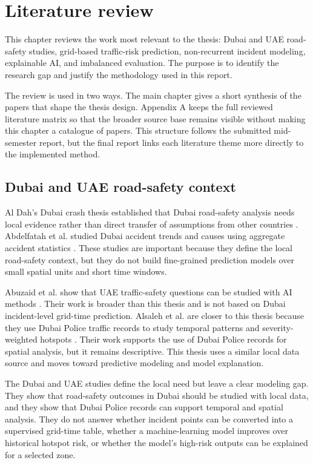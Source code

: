 \chapter{Literature review}

This chapter reviews the work most relevant to the thesis: Dubai and UAE road-safety studies, grid-based traffic-risk prediction, non-recurrent incident modeling, explainable AI, and imbalanced evaluation. The purpose is to identify the research gap and justify the methodology used in this report.

The review is used in two ways. The main chapter gives a short synthesis of the papers that shape the thesis design. Appendix A keeps the full reviewed literature matrix so that the broader source base remains visible without making this chapter a catalogue of papers. This structure follows the submitted mid-semester report, but the final report links each literature theme more directly to the implemented method.

\section{Dubai and UAE road-safety context}

Al Dah's Dubai crash thesis established that Dubai road-safety analysis needs local evidence rather than direct transfer of assumptions from other countries \cite{aldah2010dubai}. Abdelfatah et al. studied Dubai accident trends and causes using aggregate accident statistics \cite{abdelfatah2015dubai}. These studies are important because they define the local road-safety context, but they do not build fine-grained prediction models over small spatial units and short time windows.

Abuzaid et al. show that UAE traffic-safety questions can be studied with AI methods \cite{abuzaid2024uae}. Their work is broader than this thesis and is not based on Dubai incident-level grid-time prediction. Alsaleh et al. are closer to this thesis because they use Dubai Police traffic records to study temporal patterns and severity-weighted hotspots \cite{alsaleh2026dubaihotspots}. Their work supports the use of Dubai Police records for spatial analysis, but it remains descriptive. This thesis uses a similar local data source and moves toward predictive modeling and model explanation.

The Dubai and UAE studies define the local need but leave a clear modeling gap. They show that road-safety outcomes in Dubai should be studied with local data, and they show that Dubai Police records can support temporal and spatial analysis. They do not answer whether incident points can be converted into a supervised grid-time table, whether a machine-learning model improves over historical hotspot risk, or whether the model's high-risk outputs can be explained for a selected zone.

